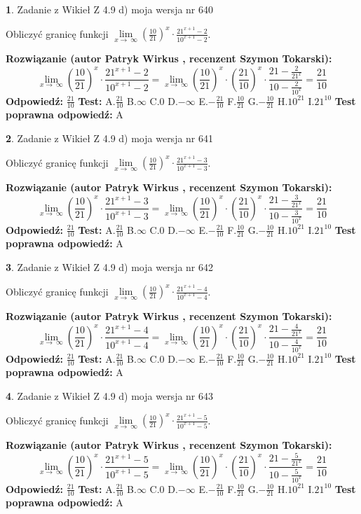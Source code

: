 \documentclass[12pt, a4paper]{article}
\theoremstyle{definition} %
\newtheorem{zad}{}
\newcommand{\zadStart}[1]{\begin{zad}#1\newline}
\newcommand{\zadStop}{\end{zad}}
\newcommand{\rozwStart}[2]{\noindent \textbf{Rozwiązanie (autor #1 , recenzent #2): }\newline}
\newcommand{\rozwStop}{\newline}
\newcommand{\odpStart}{\noindent \textbf{Odpowiedź:}\newline}
\newcommand{\odpStop}{\newline}
\newcommand{\testStart}{\noindent \textbf{Test:}\newline}
\newcommand{\testStop}{\newline}
\newcommand{\kluczStart}{\noindent \textbf{Test poprawna odpowiedź:}\newline}
\newcommand{\kluczStop}{\newline}
\begin{document}
\zadStart{Zadanie z Wikieł Z 4.9 d) moja wersja nr 640}


Obliczyć granicę funkcji  $\lim\limits_{x\to\ \infty}(\frac{10}{21})^{x}\cdot\frac{21^{x+1}-2}{10^{x+1}-2}$.
\zadStop
\rozwStart{Patryk Wirkus}{Szymon Tokarski}
$$\lim\limits_{x\to\ \infty}(\frac{10}{21})^{x}\cdot\frac{21^{x+1}-2}{10^{x+1}-2}=\lim\limits_{x\to\ \infty}(\frac{10}{21})^{x}\cdot(\frac{21}{10})^{x} \cdot \frac{21-\frac{2}{21^{x}}}{10-\frac{2}{10^{x}}} = \frac{21}{10}$$
\rozwStop
\odpStart
$\frac{21}{10}$
\odpStop
\testStart
A.$\frac{21}{10}$ B.$\infty$ C.$0$ D.$-\infty$ E.$-\frac{21}{10}$
F.$\frac{10}{21}$ G.$-\frac{10}{21}$
H.$10^{21}$
I.$21^{10}$
\testStop
\kluczStart
A
\kluczStop



\zadStart{Zadanie z Wikieł Z 4.9 d) moja wersja nr 641}


Obliczyć granicę funkcji  $\lim\limits_{x\to\ \infty}(\frac{10}{21})^{x}\cdot\frac{21^{x+1}-3}{10^{x+1}-3}$.
\zadStop
\rozwStart{Patryk Wirkus}{Szymon Tokarski}
$$\lim\limits_{x\to\ \infty}(\frac{10}{21})^{x}\cdot\frac{21^{x+1}-3}{10^{x+1}-3}=\lim\limits_{x\to\ \infty}(\frac{10}{21})^{x}\cdot(\frac{21}{10})^{x} \cdot \frac{21-\frac{3}{21^{x}}}{10-\frac{3}{10^{x}}} = \frac{21}{10}$$
\rozwStop
\odpStart
$\frac{21}{10}$
\odpStop
\testStart
A.$\frac{21}{10}$ B.$\infty$ C.$0$ D.$-\infty$ E.$-\frac{21}{10}$
F.$\frac{10}{21}$ G.$-\frac{10}{21}$
H.$10^{21}$
I.$21^{10}$
\testStop
\kluczStart
A
\kluczStop



\zadStart{Zadanie z Wikieł Z 4.9 d) moja wersja nr 642}


Obliczyć granicę funkcji  $\lim\limits_{x\to\ \infty}(\frac{10}{21})^{x}\cdot\frac{21^{x+1}-4}{10^{x+1}-4}$.
\zadStop
\rozwStart{Patryk Wirkus}{Szymon Tokarski}
$$\lim\limits_{x\to\ \infty}(\frac{10}{21})^{x}\cdot\frac{21^{x+1}-4}{10^{x+1}-4}=\lim\limits_{x\to\ \infty}(\frac{10}{21})^{x}\cdot(\frac{21}{10})^{x} \cdot \frac{21-\frac{4}{21^{x}}}{10-\frac{4}{10^{x}}} = \frac{21}{10}$$
\rozwStop
\odpStart
$\frac{21}{10}$
\odpStop
\testStart
A.$\frac{21}{10}$ B.$\infty$ C.$0$ D.$-\infty$ E.$-\frac{21}{10}$
F.$\frac{10}{21}$ G.$-\frac{10}{21}$
H.$10^{21}$
I.$21^{10}$
\testStop
\kluczStart
A
\kluczStop



\zadStart{Zadanie z Wikieł Z 4.9 d) moja wersja nr 643}


Obliczyć granicę funkcji  $\lim\limits_{x\to\ \infty}(\frac{10}{21})^{x}\cdot\frac{21^{x+1}-5}{10^{x+1}-5}$.
\zadStop
\rozwStart{Patryk Wirkus}{Szymon Tokarski}
$$\lim\limits_{x\to\ \infty}(\frac{10}{21})^{x}\cdot\frac{21^{x+1}-5}{10^{x+1}-5}=\lim\limits_{x\to\ \infty}(\frac{10}{21})^{x}\cdot(\frac{21}{10})^{x} \cdot \frac{21-\frac{5}{21^{x}}}{10-\frac{5}{10^{x}}} = \frac{21}{10}$$
\rozwStop
\odpStart
$\frac{21}{10}$
\odpStop
\testStart
A.$\frac{21}{10}$ B.$\infty$ C.$0$ D.$-\infty$ E.$-\frac{21}{10}$
F.$\frac{10}{21}$ G.$-\frac{10}{21}$
H.$10^{21}$
I.$21^{10}$
\testStop
\kluczStart
A
\kluczStop
\end{document}
